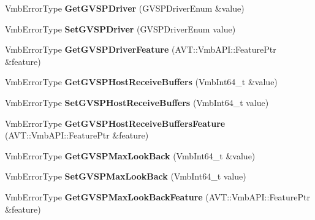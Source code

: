 \begin{DoxyCompactItemize}
\item 
\hypertarget{classMakoCamera_aaa66250ddad6537c19a2033326b7f431}{Vmb\-Error\-Type {\bfseries Get\-G\-V\-S\-P\-Driver} (G\-V\-S\-P\-Driver\-Enum \&value)}\label{classMakoCamera_aaa66250ddad6537c19a2033326b7f431}

\item 
\hypertarget{classMakoCamera_a4b5f7b3bf68193c9f57f2c97fa4ffa1e}{Vmb\-Error\-Type {\bfseries Set\-G\-V\-S\-P\-Driver} (G\-V\-S\-P\-Driver\-Enum value)}\label{classMakoCamera_a4b5f7b3bf68193c9f57f2c97fa4ffa1e}

\item 
\hypertarget{classMakoCamera_a23cc278e3a123d32392d668fa24a4b7e}{Vmb\-Error\-Type {\bfseries Get\-G\-V\-S\-P\-Driver\-Feature} (A\-V\-T\-::\-Vmb\-A\-P\-I\-::\-Feature\-Ptr \&feature)}\label{classMakoCamera_a23cc278e3a123d32392d668fa24a4b7e}

\item 
\hypertarget{classMakoCamera_ae7556cd3a0ca20d6dc407087588eece8}{Vmb\-Error\-Type {\bfseries Get\-G\-V\-S\-P\-Host\-Receive\-Buffers} (Vmb\-Int64\-\_\-t \&value)}\label{classMakoCamera_ae7556cd3a0ca20d6dc407087588eece8}

\item 
\hypertarget{classMakoCamera_a9f2d181a157aa2f76b597180e411b092}{Vmb\-Error\-Type {\bfseries Set\-G\-V\-S\-P\-Host\-Receive\-Buffers} (Vmb\-Int64\-\_\-t value)}\label{classMakoCamera_a9f2d181a157aa2f76b597180e411b092}

\item 
\hypertarget{classMakoCamera_af1df84ce7539b6a0a2211d7674703dc4}{Vmb\-Error\-Type {\bfseries Get\-G\-V\-S\-P\-Host\-Receive\-Buffers\-Feature} (A\-V\-T\-::\-Vmb\-A\-P\-I\-::\-Feature\-Ptr \&feature)}\label{classMakoCamera_af1df84ce7539b6a0a2211d7674703dc4}

\item 
\hypertarget{classMakoCamera_ad11eee83fc8ae9acf50c428f803a8f93}{Vmb\-Error\-Type {\bfseries Get\-G\-V\-S\-P\-Max\-Look\-Back} (Vmb\-Int64\-\_\-t \&value)}\label{classMakoCamera_ad11eee83fc8ae9acf50c428f803a8f93}

\item 
\hypertarget{classMakoCamera_afde515c087b96e893b48ea4455431e3c}{Vmb\-Error\-Type {\bfseries Set\-G\-V\-S\-P\-Max\-Look\-Back} (Vmb\-Int64\-\_\-t value)}\label{classMakoCamera_afde515c087b96e893b48ea4455431e3c}

\item 
\hypertarget{classMakoCamera_a03b1ea9f6107c7adc5c9bb57c324b8bc}{Vmb\-Error\-Type {\bfseries Get\-G\-V\-S\-P\-Max\-Look\-Back\-Feature} (A\-V\-T\-::\-Vmb\-A\-P\-I\-::\-Feature\-Ptr \&feature)}\label{classMakoCamera_a03b1ea9f6107c7adc5c9bb57c324b8bc}


\end{DoxyCompactItemize}
